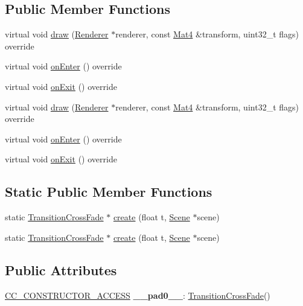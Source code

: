 \subsection*{Public Member Functions}
\begin{DoxyCompactItemize}
\item 
virtual void \hyperlink{classTransitionCrossFade_a261b721fc33fb8eaa01efeeb3d88db56}{draw} (\hyperlink{classRenderer}{Renderer} $\ast$renderer, const \hyperlink{classMat4}{Mat4} \&transform, uint32\+\_\+t flags) override
\item 
virtual void \hyperlink{classTransitionCrossFade_a453757b830ce0be18bc27ded6634d949}{on\+Enter} () override
\item 
virtual void \hyperlink{classTransitionCrossFade_a87aa5397c6cdba91bd477a9df1534730}{on\+Exit} () override
\item 
virtual void \hyperlink{classTransitionCrossFade_a5eeb7d0ad58586a1b0971d12275a5460}{draw} (\hyperlink{classRenderer}{Renderer} $\ast$renderer, const \hyperlink{classMat4}{Mat4} \&transform, uint32\+\_\+t flags) override
\item 
virtual void \hyperlink{classTransitionCrossFade_acd2958371059f6a1accb7ad12645090a}{on\+Enter} () override
\item 
virtual void \hyperlink{classTransitionCrossFade_a18832603241957b4c6700b84b7b587e0}{on\+Exit} () override
\end{DoxyCompactItemize}
\subsection*{Static Public Member Functions}
\begin{DoxyCompactItemize}
\item 
static \hyperlink{classTransitionCrossFade}{Transition\+Cross\+Fade} $\ast$ \hyperlink{classTransitionCrossFade_a5bf21ab9441cfcfbfb8df4eefff2c4bb}{create} (float t, \hyperlink{classScene}{Scene} $\ast$scene)
\item 
static \hyperlink{classTransitionCrossFade}{Transition\+Cross\+Fade} $\ast$ \hyperlink{classTransitionCrossFade_a49e0224a50db3295b86cde042c084848}{create} (float t, \hyperlink{classScene}{Scene} $\ast$scene)
\end{DoxyCompactItemize}
\subsection*{Public Attributes}
\begin{DoxyCompactItemize}
\item 
\mbox{\label{classTransitionCrossFade_a7ff5864e7a276f4e1e4797862301d541}} 
\hyperlink{_2cocos2d_2cocos_2base_2ccConfig_8h_a25ef1314f97c35a2ed3d029b0ead6da0}{C\+C\+\_\+\+C\+O\+N\+S\+T\+R\+U\+C\+T\+O\+R\+\_\+\+A\+C\+C\+E\+SS} {\bfseries \+\_\+\+\_\+pad0\+\_\+\+\_\+}\+: \hyperlink{classTransitionCrossFade}{Transition\+Cross\+Fade}()
\end{DoxyCompactItemize}
